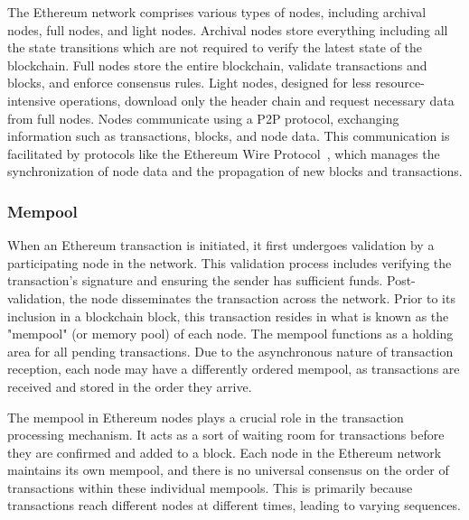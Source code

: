 The Ethereum network comprises various types of nodes, including archival nodes, full nodes, and light nodes. Archival nodes store everything including all the state transitions which are not required to verify the latest state of the blockchain. Full nodes store the entire blockchain, validate transactions and blocks, and enforce consensus rules. Light nodes, designed for less resource-intensive operations, download only the header chain and request necessary data from full nodes. Nodes communicate using a P2P protocol, exchanging information such as transactions, blocks, and node data. This communication is facilitated by protocols like the Ethereum Wire Protocol~\cite{ethereumwireprotocol}, which manages the synchronization of node data and the propagation of new blocks and transactions.


\subsubsection{Mempool}

When an Ethereum transaction is initiated, it first undergoes validation by a participating node in the network. This validation process includes verifying the transaction's signature and ensuring the sender has sufficient funds. Post-validation, the node disseminates the transaction across the network. Prior to its inclusion in a blockchain block, this transaction resides in what is known as the "mempool" (or memory pool) of each node. The mempool functions as a holding area for all pending transactions. Due to the asynchronous nature of transaction reception, each node may have a differently ordered mempool, as transactions are received and stored in the order they arrive.

The mempool in Ethereum nodes plays a crucial role in the transaction processing mechanism. It acts as a sort of waiting room for transactions before they are confirmed and added to a block. Each node in the Ethereum network maintains its own mempool, and there is no universal consensus on the order of transactions within these individual mempools. This is primarily because transactions reach different nodes at different times, leading to varying sequences.


